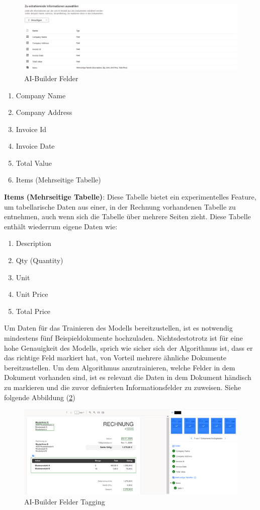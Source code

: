 \begin{figure}[h]
    \centering
    \includegraphics[scale=0.5]{sections/cloud-computing/images/ai-builder-fields.png}
    \caption{AI-Builder Felder}
    \label{fig:ai-builder-fields-figure}
\end{figure}

\begin{enumerate}
    \item Company Name
    \item Company Address
    \item Invoice Id
    \item Invoice Date
    \item Total Value
    \item Items (Mehrseitige Tabelle)
\end{enumerate}

\textbf{Items (Mehrseitige Tabelle)}: Diese Tabelle bietet ein experimentelles Feature, um tabellarische Daten aus einer, in der Rechnung vorhandenen Tabelle zu entnehmen, auch wenn sich die Tabelle über mehrere Seiten zieht. Diese Tabelle enthält wiederrum eigene Daten wie:

\label{enum:InvoiceItemsAttributs}
\begin{enumerate}
    \item Description
    \item Qty (Quantity)
    \item Unit
    \item Unit Price
    \item Total Price
\end{enumerate}


Um Daten für das Trainieren des Modells bereitzustellen, ist es notwendig mindestens fünf Beispieldokumente hochzuladen. Nichtsdestotrotz ist für eine hohe Genauigkeit des Modells, sprich wie sicher sich der Algorithmus ist, dass er das richtige Feld markiert hat, von Vorteil mehrere ähnliche Dokumente bereitzustellen. 
Um dem Algorithmus anzutrainieren, welche Felder in dem Dokument vorhanden sind, ist es relevant die Daten in dem Dokument händisch zu markieren und die zuvor definierten Informationsfelder zu zuweisen. Siehe folgende Abbildung (\ref{fig:ai-builder-tagging-figure})

\begin{figure}[h]
    \centering
    \includegraphics[scale=0.9]{sections/cloud-computing/images/ai-builder-tagging.png}
    \caption{AI-Builder Felder Tagging}
    \label{fig:ai-builder-tagging-figure}
\end{figure}